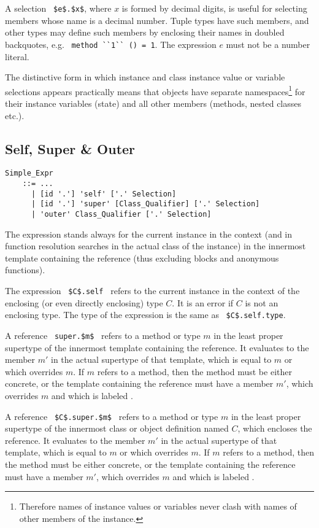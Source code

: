 A selection ~\lstinline!$e$.$x$!, where $x$ is formed by decimal digits, is useful for selecting members whose name is a decimal number. Tuple types have such members, and other types may define such members by enclosing their names in doubled backquotes, e.g. ~\lstinline!method ``1`` () = 1!. The expression $e$ must not be a number literal. 

The distinctive form in which instance and class instance value or variable selections appears practically means that objects have separate namespaces\footnote{Therefore names of instance values or variables never clash with names of other members of the instance.} for their instance variables (state) and all other members (methods, nested classes etc.). 





\subsection{Self, Super \& Outer}
\label{sec:self-this-super}

\grammar\begin{lstlisting}
Simple_Expr 
    ::= ...
      | [id '.'] 'self' ['.' Selection]
      | [id '.'] 'super' [Class_Qualifier] ['.' Selection]
      | 'outer' Class_Qualifier ['.' Selection]
\end{lstlisting}

The expression  stands always for the current instance in the context (and in function resolution searches in the actual class of the instance) in the innermost template containing the reference (thus excluding blocks and anonymous functions). 

The expression ~\lstinline!$C$.self!~ refers to the current instance in the context of the enclosing (or even directly enclosing) type $C$. It is an error if $C$ is not an enclosing type. The type of the expression is the same as ~\lstinline!$C$.self.type!. 

A reference ~\lstinline!super.$m$!~ refers to a method or type $m$ in the least proper supertype of the innermost template containing the reference. It evaluates to the member $m'$ in the actual supertype of that template, which is equal to $m$ or which overrides $m$. If $m$ refers to a method, then the method must be either concrete, or the template containing the reference must have a member $m'$, which overrides $m$ and which is labeled . 

A reference ~\lstinline!$C$.super.$m$!~ refers to a method or type $m$ in the least proper supertype of the innermost class or object definition named $C$, which encloses the reference. It evaluates to the member $m'$ in the actual supertype of that template, which is equal to $m$ or which overrides $m$. If $m$ refers to a method, then the method must be either concrete, or the template containing the reference must have a member $m'$, which overrides $m$ and which is labeled . 

